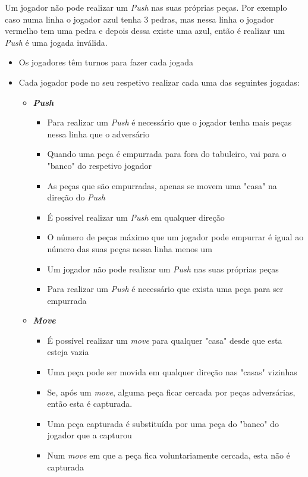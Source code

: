 \documentclass[a4paper]{article}
\begin{document}
Um jogador não pode realizar um  \textit{Push} nas suas próprias peças. Por exemplo caso numa linha o jogador azul tenha 3 pedras, mas nessa linha o jogador vermelho tem uma pedra e depois dessa existe uma azul, então é realizar um  \textit{Push} é uma jogada inválida.




\begin{itemize}
	\item Os jogadores têm turnos para fazer cada jogada
	\item Cada jogador pode no seu respetivo realizar cada uma das seguintes jogadas:
			\begin{itemize}
				\item[] \textbf{\textit{Push}}
				\begin{itemize}
					\item Para realizar um \textit{Push} é necessário que o jogador tenha mais peças nessa linha que o adversário
					\item Quando uma peça é empurrada para fora do tabuleiro, vai para o "banco" do respetivo jogador
					\item As peças que são empurradas, apenas se movem uma "casa" na direção do \textit{Push}
					\item É possível realizar um \textit{Push} em qualquer direção
					\item O número de peças máximo que um jogador pode empurrar é igual ao número das suas peças nessa linha menos um
					\item Um jogador não pode realizar um \textit{Push} nas suas próprias peças
					\item Para realizar um \textit{Push} é necessário que exista uma peça para ser empurrada
				\end{itemize}
				\item[] \textbf{\textit{Move}}
				\begin{itemize}
					\item É possível realizar um \textit{move} para qualquer "casa" desde que esta esteja vazia
					\item Uma peça pode ser movida em qualquer direção nas "casas" vizinhas
					\item Se, após um \textit{move}, alguma peça ficar cercada por peças adversárias, então esta é capturada.
					\item Uma peça capturada é substituída por uma peça do "banco" do jogador que a capturou
					\item Num \textit{move} em que a peça fica voluntariamente cercada, esta não é capturada

\end{itemize}
\end{itemize}
\end{itemize}
\end{document}
